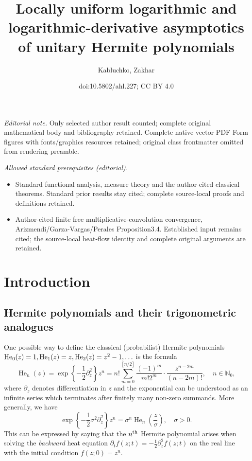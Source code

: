 \documentclass[10pt]{amsart}
\title{Locally uniform logarithmic and logarithmic-derivative asymptotics of unitary Hermite polynomials}
\author{Kabluchko, Zakhar}
\date{doi:10.5802/ahl.227; CC BY 4.0}
\theoremstyle{definition}\newtheorem{defi}[theo]{Definition}\newtheorem{rema}[theo]{Remark}\newtheorem{exam}[theo]{Example}\newtheorem{exem}[theo]{Example}\newtheorem{nota}[theo]{Notation}
\DeclareMathOperator*{\He}{He}
\newcommand{\N}{\mathbb{N}}
\begin{document}
\maketitle
\noindent\textit{Editorial note.} Only selected author result counted; complete original mathematical body and bibliography retained. Complete native vector PDF Form figures with fonts/graphics resources retained; original class frontmatter omitted from rendering preamble.\par\medskip
\noindent\textit{Allowed standard prerequisites (editorial).}\begin{itemize}
\item Standard functional analysis, measure theory and the author-cited classical theorems. Standard prior results stay cited; complete source-local proofs and definitions retained.
\item Author-cited finite free multiplicative-convolution convergence, Arizmendi/Garza-Vargas/Perales Proposition3.4. Established input remains cited; the source-local heat-flow identity and complete original arguments are retained.
\end{itemize}\medskip

\section{Introduction}
\subsection{Hermite polynomials and their trigonometric analogues}

One possible way to define the classical (probabilist) Hermite polynomials $\He_0(z)\linebreak = 1, \He_1(z) = z, \He_2(z)=z^2-1,\ldots$ is the formula
\begin{equation}\label{eq:hermite_poly_def}
\He\nolimits_n(z) =
\exp\left\{-\frac 1 2 \partial_z^2\right\} z^n = n! \sum_{m=0}^{[n/2]} \frac{(-1)^m }{m! 2^m} \cdot \frac{z^{n-2m}}{(n-2m)!},
\quad n\in \N_0,
\end{equation}
where $\partial_z$ denotes differentiation in $z$ and the exponential can be understood as an infinite series which terminates after finitely many non-zero summands. More generally, we have
\begin{equation}\label{eq:eq:hermite_exp_on_z^n_with_sigma}
\exp\left\{-\frac{1}{2}\sigma^2 \partial_z^2\right\} z^n = \sigma^n \He\nolimits_n\left(\frac{z}{\sigma}\right), \quad \sigma >0.
\end{equation}
This can be expressed by saying that the $n^{\text{\normalfont th}}$ Hermite polynomial arises when solving the \emph{backward} heat equation $\partial_t f(z; t) = -\frac 12 \partial^2_z f(z;t)$ on the real line with the initial condition $f(z;0) = z^n$.
\end{document}
